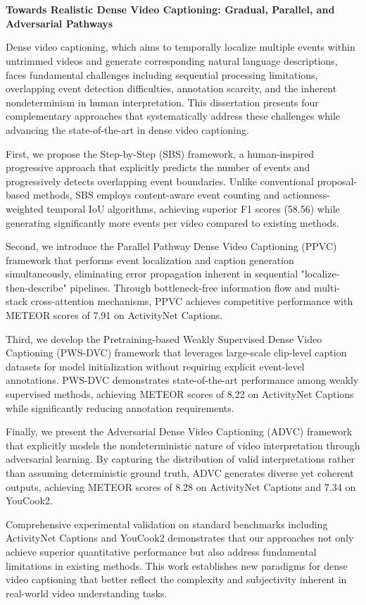 \documentclass[a4paper,12pt]{HYU}
\makeatletter
\renewenvironment{abstract}{%
    \if@twocolumn
      \section*{\abstractname}%
    \else %
      \begin{center}%
        {\bfseries \Large\abstractname\vspace{\z@}}%
      \end{center}%
      \quotation
    \fi}
    {\if@twocolumn\else\endquotation\fi}
\makeatother
\begin{document}
\newpage
\begin{abstract}
\begin{center}
\textbf{\fontsize{13pt}{13} \selectfont  Towards Realistic Dense Video Captioning: Gradual, Parallel, and Adversarial Pathways}
\end{center}
Dense video captioning, which aims to temporally localize multiple events within untrimmed videos and generate corresponding natural language descriptions, faces fundamental challenges including sequential processing limitations, overlapping event detection difficulties, annotation scarcity, and the inherent nondeterminism in human interpretation. This dissertation presents four complementary approaches that systematically address these challenges while advancing the state-of-the-art in dense video captioning.

First, we propose the Step-by-Step (SBS) framework, a human-inspired progressive approach that explicitly predicts the number of events and progressively detects overlapping event boundaries. Unlike conventional proposal-based methods, SBS employs content-aware event counting and actionness-weighted temporal IoU algorithms, achieving superior F1 scores (58.56) while generating significantly more events per video compared to existing methods.

Second, we introduce the Parallel Pathway Dense Video Captioning (PPVC) framework that performs event localization and caption generation simultaneously, eliminating error propagation inherent in sequential "localize-then-describe" pipelines. Through bottleneck-free information flow and multi-stack cross-attention mechanisms, PPVC achieves competitive performance with METEOR scores of 7.91 on ActivityNet Captions.

Third, we develop the Pretraining-based Weakly Supervised Dense Video Captioning (PWS-DVC) framework that leverages large-scale clip-level caption datasets for model initialization without requiring explicit event-level annotations. PWS-DVC demonstrates state-of-the-art performance among weakly supervised methods, achieving METEOR scores of 8.22 on ActivityNet Captions while significantly reducing annotation requirements.

Finally, we present the Adversarial Dense Video Captioning (ADVC) framework that explicitly models the nondeterministic nature of video interpretation through adversarial learning. By capturing the distribution of valid interpretations rather than assuming deterministic ground truth, ADVC generates diverse yet coherent outputs, achieving METEOR scores of 8.28 on ActivityNet Captions and 7.34 on YouCook2.

Comprehensive experimental validation on standard benchmarks including ActivityNet Captions and YouCook2 demonstrates that our approaches not only achieve superior quantitative performance but also address fundamental limitations in existing methods. This work establishes new paradigms for dense video captioning that better reflect the complexity and subjectivity inherent in real-world video understanding tasks.
\end{abstract}
\end{document}
